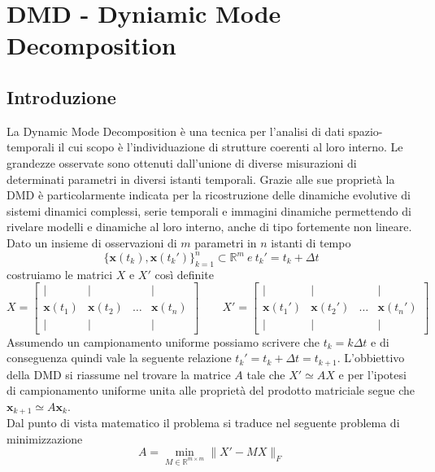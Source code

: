\documentclass[11pt]{article}
\newcommand{\R}{\mathbb{R}}
\begin{document}
\section{DMD - Dyniamic Mode Decomposition}
\subsection{Introduzione}
La Dynamic Mode Decomposition è una tecnica per l'analisi di dati spazio-temporali il cui scopo è l'individuazione di strutture coerenti al loro interno. Le grandezze osservate sono ottenuti dall'unione di diverse misurazioni di determinati parametri in diversi istanti temporali.
Grazie alle sue proprietà la DMD è particolarmente indicata  per la ricostruzione delle dinamiche evolutive di sistemi dinamici complessi, serie temporali e immagini dinamiche permettendo di rivelare modelli e dinamiche al loro interno, anche di tipo fortemente non lineare.\\ Dato un insieme di osservazioni di $m$ parametri in $n$ istanti di tempo \[ \{\mathbf{x}(t_k),\mathbf{x}(t_k')\}_{k=1}^n \subset \R^m \ e \ t_k'=t_k + \Delta t \]  costruiamo le matrici $X$ e $X'$ così definite
$$ X= \begin{bmatrix}
| & | &  & | \\
\mathbf{x}(t_1) & \mathbf{x}(t_2) & \dots & \mathbf{x}(t_n)\\
| & | & & |
\end{bmatrix} \quad \quad
X'= \begin{bmatrix}
| & | &  & | \\
\mathbf{x}(t_1') & \mathbf{x}(t_2') & \dots & \mathbf{x}(t_n')\\
| & | & & |
\end{bmatrix}
$$
Assumendo un campionamento uniforme possiamo scrivere che $t_k=k\Delta t$ e di conseguenza quindi vale la seguente relazione $t_k'= t_k+\Delta t=t_{k+1}$.
L'obbiettivo della DMD si riassume nel trovare la matrice $A$ tale che $X' \simeq AX$ e per l'ipotesi di campionamento uniforme unita alle proprietà del prodotto matriciale segue che $\mathbf{x}_{k+1} \simeq A\mathbf{x}_k$.\\
Dal punto di vista matematico il problema si traduce nel seguente problema di minimizzazione 
\[A= \min_{M \in \R^{m \times m}}{\|X' -MX\|_F } \]
\end{document}
